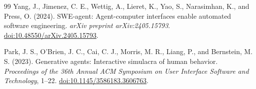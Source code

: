 \documentclass[11pt]{article}
\begin{document}
\begin{thebibliography}{99}
Yang, J., Jimenez, C. E., Wettig, A., Lieret, K., Yao, S., Narasimhan, K., and
Press, O. (2024).
\newblock SWE-agent: Agent-computer interfaces enable automated software
engineering.
\newblock \emph{arXiv preprint arXiv:2405.15793}.
\newblock \href{https://doi.org/10.48550/arXiv.2405.15793}{doi:10.48550/arXiv.2405.15793}.

Park, J. S., O'Brien, J. C., Cai, C. J., Morris, M. R., Liang, P., and
Bernstein, M. S. (2023).
\newblock Generative agents: Interactive simulacra of human behavior.
\newblock \emph{Proceedings of the 36th Annual ACM Symposium on User Interface
Software and Technology}, 1--22.
\newblock \href{https://doi.org/10.1145/3586183.3606763}{doi:10.1145/3586183.3606763}.

\end{thebibliography}
\end{document}
